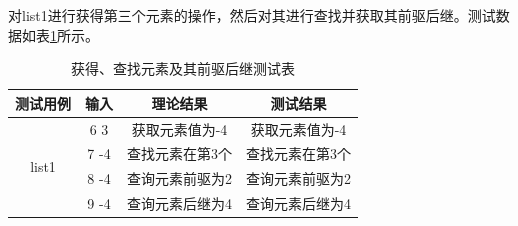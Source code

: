 \documentclass[supercite]{Experimental_Report}
\theoremstyle{definition}
\begin{document}
\begin{enumerate}
	对list1进行获得第三个元素的操作，然后对其进行查找并获取其前驱后继。测试数据如表\ref{table2}所示。
	\begin{table}
		\begin{center}
		\setlength{\tabcolsep}{2.0mm}
		\caption{获得、查找元素及其前驱后继测试表}
		\label{table2}
			\begin{tabular}{c|c|c|c}
			\hline
			测试用例    			     & 输入               & 理论结果         & 测试结果\\
			\hline
			\hline			
			\multirow{4}{*}{list1}   	& 6 3              	 & 获取元素值为-4   & 获取元素值为-4\\
										& 7 -4             	 & 查找元素在第3个  & 查找元素在第3个\\
										& 8	-4		         & 查询元素前驱为2  & 查询元素前驱为2\\
										& 9	-4			     & 查询元素后继为4  & 查询元素后继为4\\
			\hline
			\end{tabular}
		\end{center}
	\end{table}


\end{enumerate}
\end{document}
